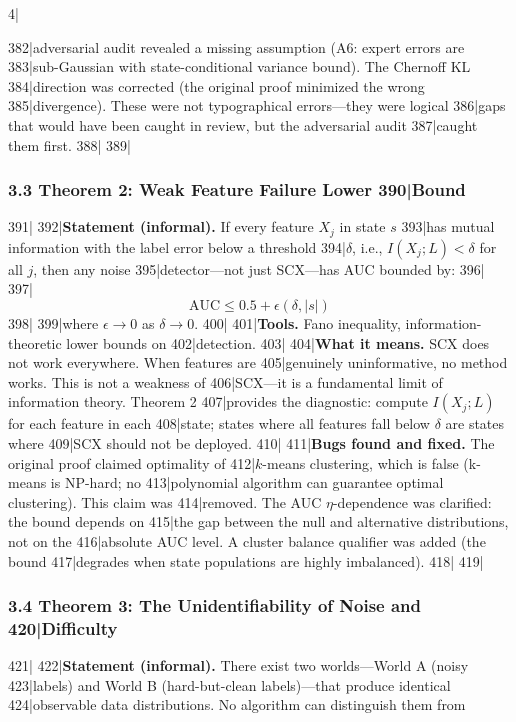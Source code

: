 4|\documentclass[
5|  12pt,
6|]{ctexart}
\begin{document}
382|adversarial audit revealed a missing assumption (A6: expert errors are
383|sub-Gaussian with state-conditional variance bound). The Chernoff KL
384|direction was corrected (the original proof minimized the wrong
385|divergence). These were not typographical errors---they were logical
386|gaps that would have been caught in review, but the adversarial audit
387|caught them first.
388|
389|\subsubsection{3.3 Theorem 2: Weak Feature Failure Lower
390|Bound}\label{theorem-2-weak-feature-failure-lower-bound}
391|
392|\textbf{Statement (informal).} If every feature \(X_j\) in state \(s\)
393|has mutual information with the label error below a threshold
394|\(\delta\), i.e., \(I(X_j; L) < \delta\) for all \(j\), then any noise
395|detector---not just SCX---has AUC bounded by:
396|
397|\[{\text{AUC}} \leq 0.5 + \epsilon(\delta, |s|)\]
398|
399|where \(\epsilon \to 0\) as \(\delta \to 0\).
400|
401|\textbf{Tools.} Fano inequality, information-theoretic lower bounds on
402|detection.
403|
404|\textbf{What it means.} SCX does not work everywhere. When features are
405|genuinely uninformative, no method works. This is not a weakness of
406|SCX---it is a fundamental limit of information theory. Theorem 2
407|provides the diagnostic: compute \(I(X_j; L)\) for each feature in each
408|state; states where all features fall below \(\delta\) are states where
409|SCX should not be deployed.
410|
411|\textbf{Bugs found and fixed.} The original proof claimed optimality of
412|\(k\)-means clustering, which is false (k-means is NP-hard; no
413|polynomial algorithm can guarantee optimal clustering). This claim was
414|removed. The AUC \(\eta\)-dependence was clarified: the bound depends on
415|the gap between the null and alternative distributions, not on the
416|absolute AUC level. A cluster balance qualifier was added (the bound
417|degrades when state populations are highly imbalanced).
418|
419|\subsubsection{3.4 Theorem 3: The Unidentifiability of Noise and
420|Difficulty}\label{theorem-3-the-unidentifiability-of-noise-and-difficulty}
421|
422|\textbf{Statement (informal).} There exist two worlds---World A (noisy
423|labels) and World B (hard-but-clean labels)---that produce identical
424|observable data distributions. No algorithm can distinguish them from
\end{document}

